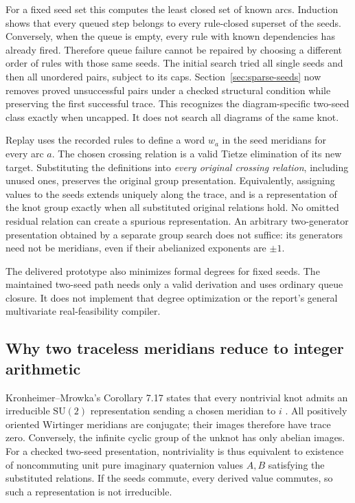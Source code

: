 For a fixed seed set this computes the least closed set of known arcs.
Induction shows that every queued step belongs to every rule-closed superset
of the seeds. Conversely, when the queue is empty, every rule with known
dependencies has already fired. Therefore queue failure cannot be repaired
by choosing a different order of rules with those same seeds. The initial search
tried all single seeds and then all unordered pairs, subject to its caps.
Section~\ref{sec:sparse-seeds} now removes proved unsuccessful pairs under
a checked structural condition while preserving the first successful trace.
This recognizes the diagram-specific two-seed class exactly when uncapped.
It does not search all diagrams of the same knot.

Replay uses the recorded rules to define a word $w_a$ in the seed meridians
for every arc $a$. The chosen crossing relation is a valid Tietze elimination
of its new target. Substituting the definitions into \emph{every original
crossing relation}, including unused ones, preserves the original group
presentation. Equivalently, assigning values to the seeds extends uniquely
along the trace, and is a representation of the knot group exactly when all
substituted original relations hold. No omitted residual relation can create
a spurious representation. An arbitrary two-generator presentation obtained
by a separate group search does not suffice: its generators need not be
meridians, even if their abelianized exponents are $\pm1$.

The delivered prototype also minimizes formal degrees for fixed seeds.
The maintained two-seed path needs only a valid derivation and uses ordinary
queue closure. It does not implement that degree optimization or the report's
general multivariate real-feasibility compiler.

\subsection{Why two traceless meridians reduce to integer arithmetic}
Kronheimer--Mrowka's Corollary 7.17 states that every nontrivial knot admits an
irreducible $\mathrm{SU}(2)$ representation sending a chosen meridian to $i$
\cite{km-traceless-primary}. All positively oriented Wirtinger meridians are
conjugate; their images therefore have trace zero. Conversely, the infinite
cyclic group of the unknot has only abelian images. For a checked two-seed
presentation, nontriviality is thus equivalent to existence of noncommuting
unit pure imaginary quaternion values $A,B$ satisfying the substituted
relations. If the seeds commute, every derived value commutes, so such a
representation is not irreducible.

